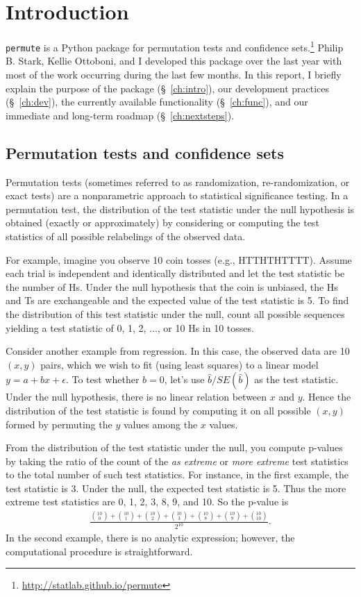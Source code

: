 \chapter{\label{ch:intro}Introduction}

\texttt{permute} is a Python package for permutation tests and confidence
sets.\footnote{\url{http://statlab.github.io/permute}}
Philip B. Stark, Kellie Ottoboni, and I developed this package over the
last year with most of the work occurring during the last few months.
In this report, I briefly explain the purpose of the package (\S~\ref{ch:intro}), our
development practices (\S~\ref{ch:dev}), the currently available functionality (\S~\ref{ch:func}), and
our immediate and long-term roadmap (\S~\ref{ch:nextsteps}).

\section{Permutation tests and confidence sets}

Permutation tests (sometimes referred to as randomization, re-randomization, or
exact tests) are a nonparametric approach to statistical significance
testing.  In a permutation test, the distribution of the test statistic under
the null hypothesis is obtained (exactly or approximately) by considering or
computing the test statistics of all possible relabelings of the observed data.

For example, imagine you observe 10 coin tosses (e.g., HTTHTHTTTT). Assume 
each trial is independent and identically distributed and let the
test statistic be the number of Hs. Under the null hypothesis that the
coin is unbiased, the Hs and Ts are exchangeable and the expected value of the
test statistic is 5. To find the distribution of this test statistic under the
null, count all possible sequences yielding a test statistic of 0,
1, 2, ..., or 10 Hs in 10 tosses.

Consider another example from regression.  In this case, the observed data are
10 $(x, y)$ pairs, which we wish to fit (using least squares) to a linear model
$y = a + bx + \epsilon$.  To test whether $b = 0$, let's use
$\hat{b}/SE(\hat{b})$ as the test statistic.  Under the null hypothesis, there
is no linear relation between $x$ and $y$. Hence the distribution of the test
statistic is found by computing it on all possible $(x, y)$ formed by permuting
the $y$ values among the $x$ values.

From the distribution of the test statistic under the null, you compute
p-values by taking the ratio of the count of the \emph{as extreme} or
\emph{more extreme} test statistics to the total number of such test
statistics.  For instance, in the first example, the test statistic is 3.
Under the null, the expected test statistic is 5.  Thus the more extreme test
statistics are 0, 1, 2, 3, 8, 9, and 10. So the p-value is
\begin{align*}
\frac{\binom{10}{0} + \binom{10}{1} + \binom{10}{2} + \binom{10}{3} +
   \binom{10}{8} + \binom{10}{9} + \binom{10}{10}}{2^{10}}.
\end{align*}
In the second example, there is no analytic expression; however, the
computational procedure is straightforward.


